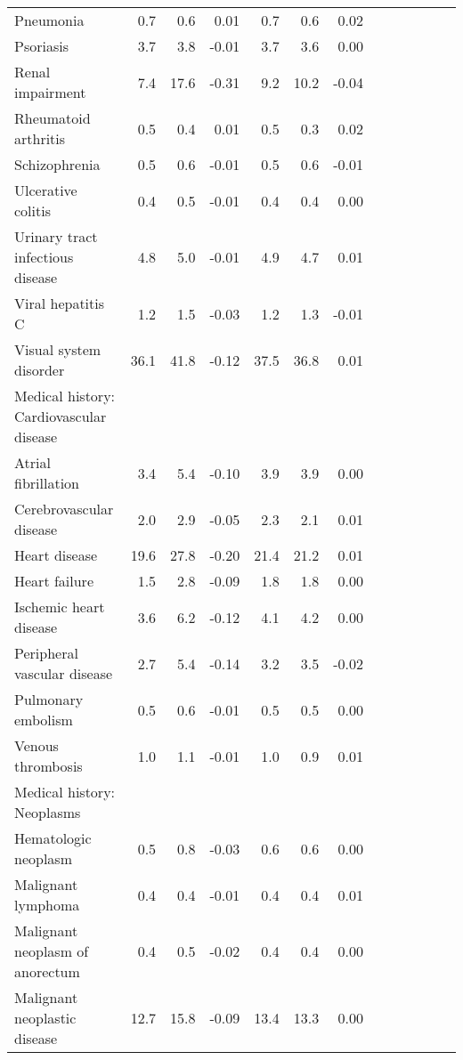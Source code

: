 \documentclass[11pt,]{article}
\begin{document}
\begin{longtable}{lrrrrrrrrrrrr}
      Pneumonia &  0.7 &  0.6 &  0.01 &  0.7 &  0.6 &  0.02 \\ 
      Psoriasis &  3.7 &  3.8 & -0.01 &  3.7 &  3.6 &  0.00 \\ 
      Renal impairment &  7.4 & 17.6 & -0.31 &  9.2 & 10.2 & -0.04 \\ 
      Rheumatoid arthritis &  0.5 &  0.4 &  0.01 &  0.5 &  0.3 &  0.02 \\ 
      Schizophrenia &  0.5 &  0.6 & -0.01 &  0.5 &  0.6 & -0.01 \\ 
      Ulcerative colitis &  0.4 &  0.5 & -0.01 &  0.4 &  0.4 &  0.00 \\ 
      Urinary tract infectious disease &  4.8 &  5.0 & -0.01 &  4.9 &  4.7 &  0.01 \\ 
      Viral hepatitis C &  1.2 &  1.5 & -0.03 &  1.2 &  1.3 & -0.01 \\ 
      Visual system disorder & 36.1 & 41.8 & -0.12 & 37.5 & 36.8 &  0.01 \\ 
  Medical history: Cardiovascular disease &    &    &     &    &    &     \\ 
      Atrial fibrillation &  3.4 &  5.4 & -0.10 &  3.9 &  3.9 &  0.00 \\ 
      Cerebrovascular disease &  2.0 &  2.9 & -0.05 &  2.3 &  2.1 &  0.01 \\ 
      Heart disease & 19.6 & 27.8 & -0.20 & 21.4 & 21.2 &  0.01 \\ 
      Heart failure &  1.5 &  2.8 & -0.09 &  1.8 &  1.8 &  0.00 \\ 
      Ischemic heart disease &  3.6 &  6.2 & -0.12 &  4.1 &  4.2 &  0.00 \\ 
      Peripheral vascular disease &  2.7 &  5.4 & -0.14 &  3.2 &  3.5 & -0.02 \\ 
      Pulmonary embolism &  0.5 &  0.6 & -0.01 &  0.5 &  0.5 &  0.00 \\ 
      Venous thrombosis &  1.0 &  1.1 & -0.01 &  1.0 &  0.9 &  0.01 \\ 
  Medical history: Neoplasms &    &    &     &    &    &     \\ 
      Hematologic neoplasm &  0.5 &  0.8 & -0.03 &  0.6 &  0.6 &  0.00 \\ 
      Malignant lymphoma &  0.4 &  0.4 & -0.01 &  0.4 &  0.4 &  0.01 \\ 
      Malignant neoplasm of anorectum &  0.4 &  0.5 & -0.02 &  0.4 &  0.4 &  0.00 \\ 
      Malignant neoplastic disease & 12.7 & 15.8 & -0.09 & 13.4 & 13.3 &  0.00 \\ 

\end{longtable}
\end{document}

